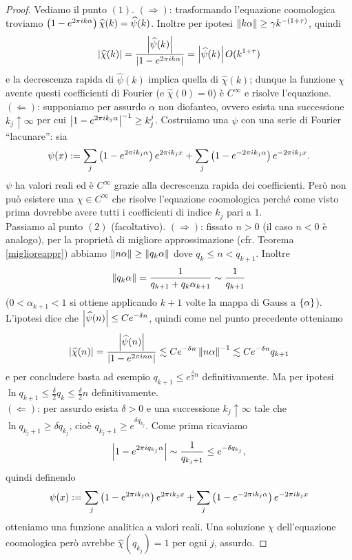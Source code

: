 \begin{proof}Vediamo il punto $(1)$. $(\Rightarrow)$: trasformando l'equazione coomologica troviamo
$\left(1-e^{2\pi i k\alpha}\right)\widehat{\chi}(k)=\widehat{\psi}(k)$. Inoltre per ipotesi
$\left\|k\alpha\right\|\ge\gamma k^{-(1+\tau)}$, quindi
\[ \left|\widehat{\chi}(k)\right|=\frac{\left|\widehat{\psi}(k)\right|}{\left|1-e^{2\pi i k\alpha}\right|}=\left|\widehat{\psi}(k)\right|O(k^{1+\tau}) \]
e la decrescenza rapida di $\widehat{\psi}(k)$ implica quella di $\widehat{\chi}(k)$;
dunque la funzione $\chi$ avente questi coefficienti di Fourier (e $\widehat{\chi}(0)=0$) è $C^\infty$ e risolve l'equazione. \\
$(\Leftarrow)$: supponiamo per assurdo $\alpha$ non diofanteo, ovvero esista una successione $k_j\uparrow\infty$
per cui $\left|1-e^{2\pi i k_j\alpha}\right|^{-1}\ge k_j^j$. Costruiamo una $\psi$ con una serie di Fourier ``lacunare'': sia
\[ \psi(x):=\sum_j \left(1-e^{2\pi i k_j\alpha}\right)e^{2\pi i k_j x}+\sum_j \left(1-e^{-2\pi i k_j\alpha}\right)e^{-2\pi i k_j x}. \]
$\psi$ ha valori reali ed è $C^\infty$ grazie alla decrescenza rapida dei coefficienti.
Però non può esistere una $\chi\in C^\infty$ che risolve l'equazione coomologica perché come visto prima
dovrebbe avere tutti i coefficienti di indice $k_j$ pari a $1$. \\
Passiamo al punto $(2)$ (facoltativo). $(\Rightarrow)$: fissato $n>0$ (il caso $n<0$ è analogo), per la proprietà di migliore approssimazione (cfr. Teorema \ref{miglioreappr})
abbiamo $\left\|n\alpha\right\|\ge\left\|q_k\alpha\right\|$ dove $q_k\le n<q_{k+1}$. Inoltre
\[ \left\|q_k\alpha\right\|=\frac{1}{q_{k+1}+q_k\alpha_{k+1}}\sim\frac{1}{q_{k+1}} \]
($0<\alpha_{k+1}<1$ si ottiene applicando $k+1$ volte la mappa di Gauss a $\left\{\alpha\right\}$).
L'ipotesi dice che $\left|\widehat{\psi}(n)\right|\le Ce^{-\delta n}$, quindi come nel punto precedente otteniamo
\[ \left|\widehat{\chi}(n)\right|=\frac{\left|\widehat{\psi}(n)\right|}{\left|1-e^{2\pi i n\alpha}\right|}\lesssim Ce^{-\delta n}\left\|n\alpha\right\|^{-1}
\lesssim Ce^{-\delta n}q_{k+1} \]
e per concludere basta ad esempio $q_{k+1}\le e^{\frac{\delta}{2}n}$ definitivamente.
Ma per ipotesi $\ln q_{k+1}\le \frac{\delta}{2}q_k\le\frac{\delta}{2}n$ definitivamente. \\
$(\Leftarrow)$: per assurdo esista $\delta>0$ e una successione $k_j\uparrow\infty$ tale che
$\ln q_{k_j+1}\ge\delta q_{k_j}$, cioè $q_{k_j+1}\ge e^{\delta q_{k_j}}$. Come prima ricaviamo
\[ \left|1-e^{2\pi i q_{k_j}\alpha}\right|\sim\frac{1}{q_{k_j+1}}\le e^{-\delta q_{k_j}}, \]
quindi definendo
\[ \psi(x):=\sum_j \left(1-e^{2\pi i k_j\alpha}\right)e^{2\pi i k_j x}+\sum_j \left(1-e^{-2\pi i k_j\alpha}\right)e^{-2\pi i k_j x} \]
otteniamo una funzione analitica a valori reali. Una soluzione $\chi$ dell'equazione coomologica però avrebbe
$\widehat{\chi}(q_{k_j})=1$ per ogni $j$, assurdo.
\end{proof}

